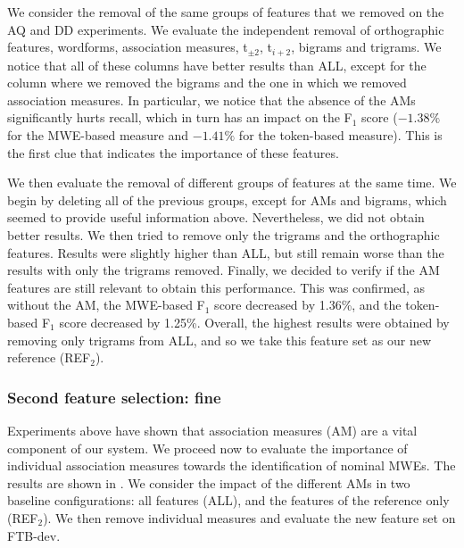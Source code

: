 \documentclass[output=paper,modfonts]{langscibook}
\begin{document}
We consider the removal of the same groups of features that we removed on the AQ and DD experiments. We evaluate the independent removal of orthographic features, wordforms, association measures, t$_{\pm 2}$, t$_{i+2}$, bigrams and trigrams. We notice that all of these columns have better results than ALL, except for the column where we removed the bigrams and the one in which we removed association measures. In particular, we notice that the absence of the AMs significantly hurts recall, which in turn has an impact on the F$_1$ score ($-1.38\%$ for the MWE-based measure and $-1.41\%$ for the token-based measure). This is the first clue that indicates the importance of these features. 

We then evaluate the removal of different groups of features at the same time. We begin by deleting all of the previous groups, except for AMs and bigrams, which seemed to provide useful information above. Nevertheless, we did not obtain better results.
We then tried to remove only the trigrams and the orthographic features. Results were slightly higher than ALL, but still remain worse than the results with only the trigrams removed. Finally, we decided to verify if the AM features are still relevant to obtain this performance. This was confirmed, as without the AM, the MWE-based F$_1$ score decreased by 1.36\%, and the token-based F$_1$ score decreased by 1.25\%. 
Overall, the highest results were obtained by removing only trigrams from ALL, and so we take this feature set as our new reference (REF$_2$).  %



\subsubsection{Second feature selection: fine}
\label{schol:sec:results-nominal-feat-fine}
Experiments above have shown that association measures (AM) are a vital component of our system.
We proceed now to evaluate the importance of individual association measures towards the identification of nominal MWEs. The results are shown in .
%
We consider the impact of the different AMs in two baseline configurations: all features (ALL), and the features of the reference only (REF$_2$). We then remove individual measures and evaluate the new feature set on FTB-dev.


\end{document}
